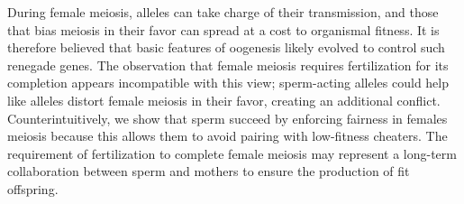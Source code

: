 \documentclass{article}
\begin{document}
During female meiosis, alleles can take charge of their transmission, and those that bias meiosis in their favor can spread at a cost to organismal fitness. It is therefore believed that basic features of oogenesis likely evolved to control such renegade genes. The observation that female meiosis requires fertilization for its completion appears incompatible with this view; sperm-acting alleles could help like alleles distort  female meiosis in their favor, creating an additional conflict. Counterintuitively, we show that sperm succeed by enforcing fairness in females meiosis because this allows them to avoid pairing with low-fitness cheaters.  The requirement of fertilization to complete female meiosis may represent a long-term collaboration between sperm and mothers to ensure the production of fit offspring.
\end{document}
